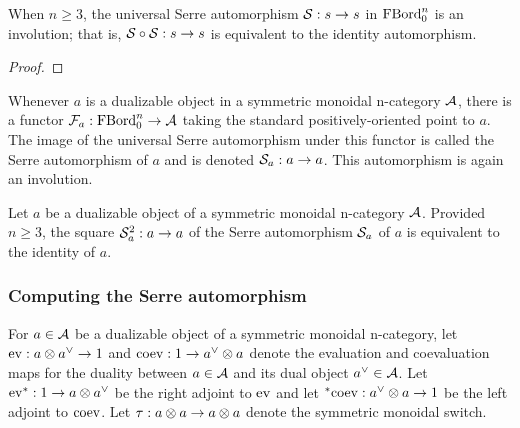 \documentclass{amsart}
\begin{document}

\begin{proposition}
When $n \geq 3$, the universal Serre automorphism $\mathcal S: s \rightarrow s$ in $\mathrm{FBord}_0^n$ is an involution; that is, $\mathcal S \circ \mathcal S : s \rightarrow s$ is equivalent to the identity automorphism.
\end{proposition}

\begin{proof}
\end{proof}

Whenever $a$ is a dualizable object in a symmetric monoidal n-category $\mathcal A$, there is a functor $\mathcal F_a: \mathrm{FBord}_0^n \rightarrow \mathcal A$ taking the standard positively-oriented point to $a$.  The image of the universal Serre automorphism under this functor is called the Serre automorphism of $a$ and is denoted $\mathcal S_a : a \rightarrow a$.  This automorphism is again an involution.

\begin{corollary} \label{cor-serreinvol}
Let $a$ be a dualizable object of a symmetric monoidal n-category $\mathcal A$.  Provided $n \geq 3$, the square $\mathcal S_a^2 : a \rightarrow a$ of the Serre automorphism $\mathcal S_a$ of $a$ is equivalent to the identity of $a$.
\end{corollary}



\subsubsection{Computing the Serre automorphism} \label{sec-serre-comp}


For $a \in \mathcal A$ be a dualizable object of a symmetric monoidal n-category, let $\mathrm{ev} : a \otimes a^{\vee} \rightarrow 1$ and $\mathrm{coev}: 1 \rightarrow a^{\vee} \otimes a$ denote the evaluation and coevaluation maps for the duality between $a \in \mathcal A$ and its dual object $a^{\vee} \in \mathcal A$.  Let ${\mathrm{ev}}^*: 1 \rightarrow a \otimes a^{\vee}$ be the right adjoint to $\mathrm{ev}$ and let ${}^*{\mathrm{coev}}: a^{\vee} \otimes a \rightarrow 1$ be the left adjoint to $\mathrm{coev}$.  Let $\tau: a \otimes a \rightarrow a \otimes a$ denote the symmetric monoidal switch.
\end{document}
